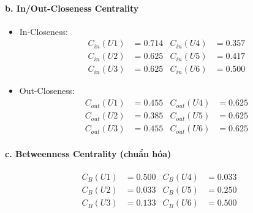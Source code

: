 \documentclass[12pt,a4paper]{article}
\begin{document}
\paragraph{b. In/Out-Closeness Centrality}
\begin{itemize}
\item In-Closeness:
    \begin{align*}
    C_{in}(U1) &= 0.714 & C_{in}(U4) &= 0.357 \\
    C_{in}(U2) &= 0.625 & C_{in}(U5) &= 0.417 \\
    C_{in}(U3) &= 0.625 & C_{in}(U6) &= 0.500
    \end{align*}
\item Out-Closeness:
    \begin{align*}
    C_{out}(U1) &= 0.455 & C_{out}(U4) &= 0.625 \\
    C_{out}(U2) &= 0.385 & C_{out}(U5) &= 0.625 \\
    C_{out}(U3) &= 0.455 & C_{out}(U6) &= 0.625
    \end{align*}
\end{itemize}

\paragraph{c. Betweenness Centrality (chuẩn hóa)}
\begin{align*}
C_B(U1) &= 0.500 & C_B(U4) &= 0.033 \\
C_B(U2) &= 0.033 & C_B(U5) &= 0.250 \\
C_B(U3) &= 0.133 & C_B(U6) &= 0.500
\end{align*}
\end{document}
